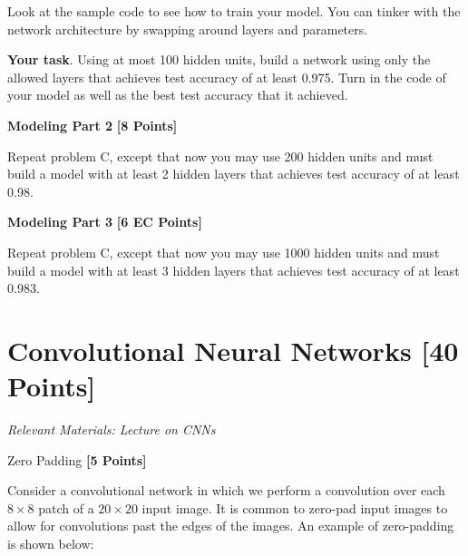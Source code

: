 Look at the sample code to see how to train your model. You can tinker with the network architecture by swapping around layers and parameters.

\textbf{Your task}. Using at most 100 hidden units, build a network using only the allowed layers that achieves test accuracy of at least 0.975. Turn in the code of your model as well as the best test accuracy that it achieved.



\begin{solution}

\end{solution}


 \problem \textbf{Modeling Part 2} \textbf{[8 Points]}

 Repeat problem C, except that now you may use 200 hidden units and must build a model with at least 2 hidden layers that achieves test accuracy of at least 0.98.

\begin{solution}
 
\end{solution}

 \problem \textbf{Modeling Part 3} \textbf{[6 EC Points]}

 Repeat problem C, except that now you may use 1000 hidden units and must build a model with at least 3 hidden layers that achieves test accuracy of at least 0.983.

\begin{solution}

\end{solution}

 \newpage
 \section{Convolutional Neural Networks  [40 Points]}
 \textit{Relevant Materials: Lecture on CNNs}

 \problem Zero Padding \textbf{[5 Points]}

 Consider a convolutional network in which we perform a convolution over each $8 \times 8$ patch of a $20 \times 20$ input image. It is common to zero-pad input images to allow for convolutions past the edges of the images. An example of zero-padding is shown below:

